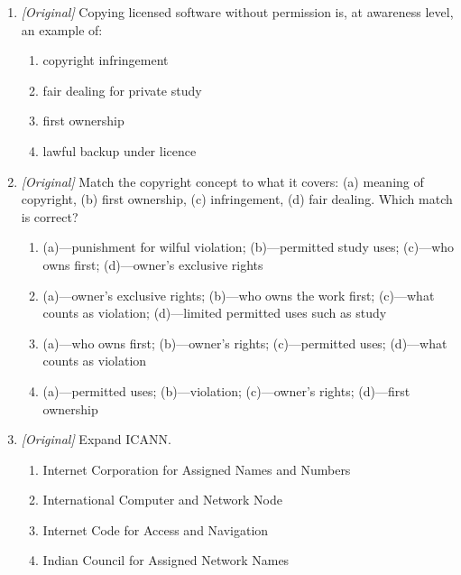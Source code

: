 \documentclass[11pt]{article}
\begin{document}
\begin{enumerate}[label=\textbf{Q\arabic*.}, leftmargin=*]
  \begin{enumerate}[label=\Alph*.]
    \item Purpose limitation (stated-purpose use)
    \item Unlimited retention
    \item Open sharing without consent
    \item Default publication
  \end{enumerate}
\item \textit{[Original]} Copying licensed software without permission is, at awareness level, an example of:
  \begin{enumerate}[label=\Alph*.]
    \item copyright infringement
    \item fair dealing for private study
    \item first ownership
    \item lawful backup under licence
  \end{enumerate}
\item \textit{[Original]} Match the copyright concept to what it covers: (a) meaning of copyright, (b) first ownership, (c) infringement, (d) fair dealing. Which match is correct?
  \begin{enumerate}[label=\Alph*.]
    \item (a)---punishment for wilful violation; (b)---permitted study uses; (c)---who owns first; (d)---owner's exclusive rights
    \item (a)---owner's exclusive rights; (b)---who owns the work first; (c)---what counts as violation; (d)---limited permitted uses such as study
    \item (a)---who owns first; (b)---owner's rights; (c)---permitted uses; (d)---what counts as violation
    \item (a)---permitted uses; (b)---violation; (c)---owner's rights; (d)---first ownership
  \end{enumerate}
\item \textit{[Original]} Expand ICANN.
  \begin{enumerate}[label=\Alph*.]
    \item Internet Corporation for Assigned Names and Numbers
    \item International Computer and Network Node
    \item Internet Code for Access and Navigation
    \item Indian Council for Assigned Network Names
  \end{enumerate}

\end{enumerate}
\end{document}
